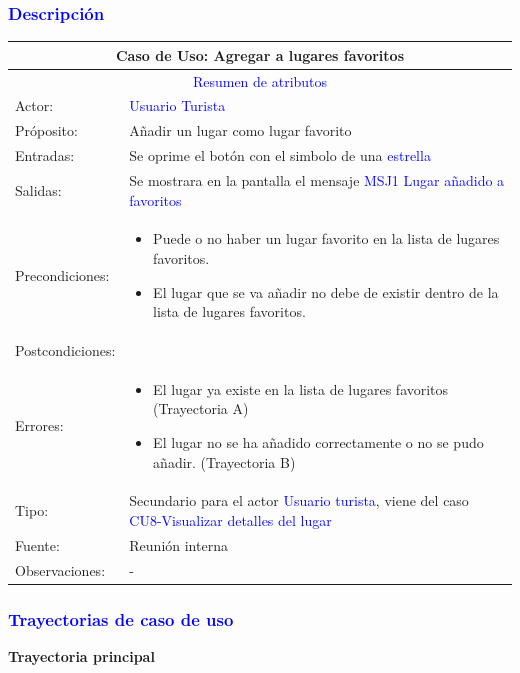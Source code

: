 \subsubsection{\textcolor{blue}{Descripción}}
\begin{tabularx}{16cm}{||l|X||}
	\hline
	\multicolumn{2}{||c||}{Caso de Uso: Agregar a lugares favoritos} \\
	\hline
	\multicolumn{2}{||c||}{\textcolor{blue}{Resumen de atributos}} \\
	\hline
	{Actor:} & {\textcolor{blue}{Usuario Turista}} \\
	\hline
	{Próposito:} & {Añadir un lugar como lugar favorito} \\
	\hline
	{Entradas:} & {Se oprime el botón con el simbolo de una \textcolor{blue}{estrella}}\\
	\hline
	{Salidas:} & {Se mostrara en la pantalla el mensaje \textcolor{blue}{MSJ1 Lugar añadido a favoritos}}\\
	\hline
	{Precondiciones:} & {\begin{itemize}
	    \item Puede o no haber un lugar favorito en la lista de lugares favoritos.
        \item El lugar que se va añadir no debe de existir dentro de la lista de lugares favoritos.
	\end{itemize}}\\ 
	\hline
	{Postcondiciones:} & {}\\
	\hline
	{Errores:} & {\begin{itemize}
	    \item El lugar ya existe en la lista de lugares favoritos (Trayectoria A)
        \item El lugar no se ha añadido correctamente o no se pudo añadir.
        (Trayectoria B)
	\end{itemize}} \\
	\hline
	{Tipo:} & {Secundario para el actor \textcolor{blue}{Usuario turista}, viene del caso \textcolor{blue}{CU8-Visualizar detalles del lugar}}\\
	\hline
	{Fuente:} & {Reunión interna} \\
	\hline
	{Observaciones:} & {-} \\
	\hline
\end{tabularx}

\pagebreak
\subsubsection{\textcolor{blue}{Trayectorias de caso de uso}}
\textbf{Trayectoria principal}
    
